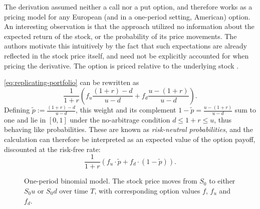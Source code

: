 \documentclass[english,12pt,a4paper,pdftex,sci,utf8]{aaltothesis}
\begin{document}
The derivation assumed neither a call nor a put option, and therefore works as a pricing model for any European (and in a one-period setting, American) option. An interesting observation is that the approach utilized no information about the expected return of the stock, or the probability of its price movements. The authors motivate this intuitively by the fact that such expectations are already reflected in the stock price itself, and need not be explicitly accounted for when pricing the derivative. The option is priced relative to the underlying stock \cite{hull2018}.\clearpage

\cref{eq:replicating-portfolio} can be rewritten as
\begin{equation*}
     \frac{1}{1+r}\left(f_u\frac{(1+r)-d}{u-d}+f_d\frac{u-(1+r)}{u-d}\right).
\end{equation*}
Defining $\tilde{p} := \frac{(1+r)-d}{u-d}$, this weight and its complement $1-\tilde{p} = \frac{u-(1+r)}{u-d}$ sum to one and lie in $[0,1]$ under the no-arbitrage condition $d \leq 1+r \leq u$, thus behaving like probabilities. These are known as \emph{risk-neutral probabilities}, and the calculation can therefore be interpreted as an expected value of the option payoff, discounted at the risk-free rate:
\begin{equation}
     \frac{1}{1+r}(f_u\cdot \tilde p + f_d \cdot (1-\tilde p)).
\label{eq:risk-neutral-expectancy}
\end{equation}

\begin{figure}[t]
    \centering
    \caption{One-period binomial model. The stock price moves from $S_0$ to either $S_0u$ or $S_0d$ over time $T$, with corresponding option values $f$, $f_u$ and $f_d$.}
    \label{fig:oneperiodbinom}
\end{figure}
\end{document}
